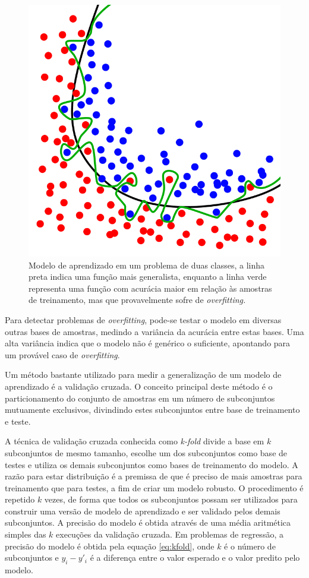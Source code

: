 \begin{figure}[h!]
  \centering
  \includegraphics[scale=0.4]{imgs/overfitting}
  \caption[Modelo de aprendizado generalista]{Modelo de aprendizado em um problema de duas classes, a linha preta indica uma função mais generalista, enquanto a linha verde representa uma função com acurácia maior em relação às amostras de treinamento, mas que provavelmente sofre de \textit{overfitting.}}
  \label{fig:overfitting}
\end{figure}

Para detectar problemas de \textit{overfitting}, pode-se testar o modelo em diversas outras bases de amostras, medindo a variância da acurácia entre estas bases. Uma alta variância indica que o modelo não é genérico o suficiente, apontando para um provável caso de \textit{overfitting}.

Um método bastante utilizado para medir a generalização de um modelo de aprendizado é a validação cruzada. O conceito principal deste método é o particionamento do conjunto de amostras em um número de subconjuntos mutuamente exclusivos, divindindo estes subconjuntos entre base de treinamento e teste.

A técnica de validação cruzada conhecida como \textit{k-fold} divide a base em $k$ subconjuntos de mesmo tamanho, escolhe um dos subconjuntos como base de testes e utiliza os demais subconjuntos como bases de treinamento do modelo. A razão para estar distribuição é a premissa de que é preciso de mais amostras para treinamento que para testes, a fim de criar um modelo robusto. O procedimento é repetido $k$ vezes, de forma que todos os subconjuntos possam ser utilizados para construir uma versão de modelo de aprendizado e ser validado pelos demais subconjuntos. A precisão do modelo é obtida através de uma média aritmética simples das $k$ execuções da validação cruzada. Em problemas de regressão, a precisão do modelo é obtida pela equação \ref{eq:kfold}, onde $k$ é o número de subconjuntos e $y_i - y'_i$ é a diferença entre o valor esperado e o valor predito pelo modelo.

